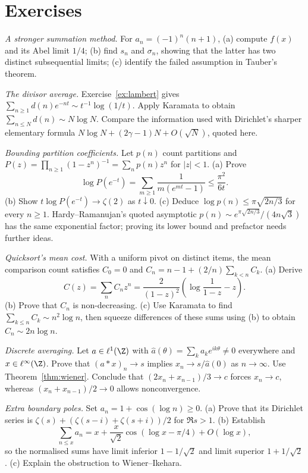 \section{Exercises}
\begin{exercise}[$\star$]\label{ex:cesaroabel}
\emph{A stronger summation method.} For $a_n=(-1)^n(n+1)$, (a) compute $f(x)$ and its Abel limit $1/4$; (b) find $s_n$ and $\sigma_n$, showing that the latter has two distinct subsequential limits; (c) identify the failed assumption in Tauber's theorem.
\end{exercise}
\begin{exercise}[$\star$]\label{ex:divisorkaramata}
\emph{The divisor average.} Exercise~\ref{ex:lambert} gives $\sum_{n\ge1}d(n)e^{-nt}\sim t^{-1}\log(1/t)$. Apply Karamata to obtain $\sum_{n\le N}d(n)\sim N\log N$. Compare the information used with Dirichlet's sharper elementary formula $N\log N+(2\gamma-1)N+O(\sqrt N)$, quoted here.
\end{exercise}
\begin{exercise}[$\star\star$]\label{ex:partitionsup}
\emph{Bounding partition coefficients.} Let $p(n)$ count partitions and $P(z)=\prod_{n\ge1}(1-z^n)^{-1}=\sum_np(n)z^n$ for $|z|<1$. (a) Prove
\[\log P(e^{-t})=\sum_{m\ge1}\frac1{m(e^{mt}-1)}\le\frac{\pi^2}{6t}.\]
(b) Show $t\log P(e^{-t})\to\zeta(2)$ as $t\downarrow0$. (c) Deduce $\log p(n)\le\pi\sqrt{2n/3}$ for every $n\ge1$. Hardy--Ramanujan's quoted asymptotic $p(n)\sim e^{\pi\sqrt{2n/3}}/(4n\sqrt3)$ has the same exponential factor; proving its lower bound and prefactor needs further ideas.
\end{exercise}
\begin{exercise}[$\star\star$]\label{ex:quicksort}
\emph{Quicksort's mean cost.} With a uniform pivot on distinct items, the mean comparison count satisfies $C_0=0$ and $C_n=n-1+(2/n)\sum_{k<n}C_k$. (a) Derive
\[C(z)=\sum_nC_nz^n=\frac{2}{(1-z)^2}\left(\log\frac1{1-z}-z\right).\]
(b) Prove that $C_n$ is non-decreasing. (c) Use Karamata to find $\sum_{k\le n}C_k\sim n^2\log n$, then squeeze differences of these sums using (b) to obtain $C_n\sim2n\log n$.
\end{exercise}
\begin{exercise}[$\star$]\label{ex:wienerZ}
\emph{Discrete averaging.} Let $a\in\ell^1(\Z)$ with $\hat a(\theta)=\sum_ka_ke^{ik\theta}\ne0$ everywhere and $x\in\ell^\infty(\Z)$. Prove that $(a*x)_n\to s$ implies $x_n\to s/\hat a(0)$ as $n\to\infty$. Use Theorem~\ref{thm:wiener}. Conclude that $(2x_n+x_{n-1})/3\to c$ forces $x_n\to c$, whereas $(x_n+x_{n-1})/2\to0$ allows nonconvergence.
\end{exercise}
\begin{exercise}[$\star\star$]\label{ex:ikeharaline}
\emph{Extra boundary poles.} Set $a_n=1+\cos(\log n)\ge0$. (a) Prove that its Dirichlet series is $\zeta(s)+(\zeta(s-i)+\zeta(s+i))/2$ for $\Re s>1$. (b) Establish
\[\sum_{n\le x}a_n=x+\frac{x}{\sqrt2}\cos(\log x-\pi/4)+O(\log x),\]
so the normalised sums have limit inferior $1-1/\sqrt2$ and limit superior $1+1/\sqrt2$. (c) Explain the obstruction to Wiener--Ikehara.
\end{exercise}

